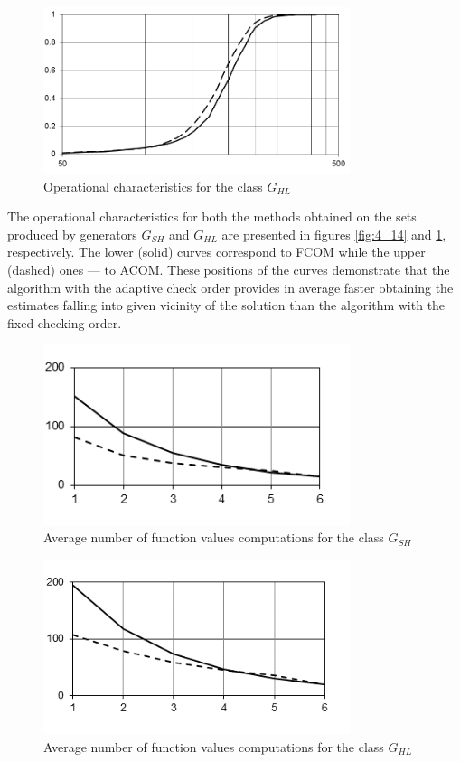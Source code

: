 \begin{figure}[ht]
  \centering
  \includegraphics[width=0.8\textwidth]{figures/4_15.png}
  \caption{Operational characteristics for the class $G_{HL}$}
  \label{fig:4_15}
\end{figure}

The operational characteristics for both the methods obtained on the sets produced by generators $G_{SH}$ and $G_{HL}$ are presented in figures \ref{fig:4_14} and \ref{fig:4_15}, respectively. The lower (solid) curves correspond to FCOM while the upper (dashed) ones --- to ACOM. These positions of the curves demonstrate that the algorithm with the adaptive check order provides in average faster obtaining the estimates falling into given vicinity of the solution than the algorithm with the fixed checking order.

\begin{figure}[ht]
  \centering
  \includegraphics[width=0.8\textwidth]{figures/4_16.png}
  \caption{Average number of function values computations for the class $G_{SH}$}
  \label{fig:4_16}
\end{figure}

\begin{figure}[ht]
  \centering
  \includegraphics[width=0.8\textwidth]{figures/4_17.png}
  \caption{Average number of function values computations for the class $G_{HL}$}
  \label{fig:4_17}
\end{figure}

